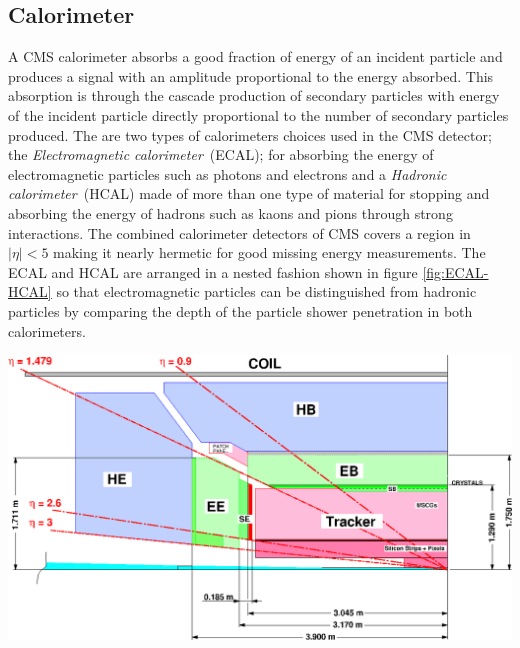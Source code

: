 \subsection{Calorimeter}
A CMS calorimeter absorbs a good fraction of energy of an incident particle and produces a signal with an amplitude proportional to the energy absorbed. This absorption is through the cascade production of secondary particles with energy of the incident particle directly proportional to the number of secondary particles produced. The are two types of calorimeters choices used in the CMS detector; the \textit{Electromagnetic calorimeter}~(ECAL); for absorbing the energy of electromagnetic particles such as photons and electrons and a \textit{Hadronic calorimeter}~(HCAL) made of more than one type of material for stopping and absorbing the energy of hadrons such as kaons and pions through strong interactions. The combined calorimeter detectors of CMS covers a region in $|\eta| < 5 $ making it nearly hermetic for good missing energy measurements. The ECAL and HCAL are arranged in a nested fashion shown in figure \ref{fig:ECAL-HCAL} so that electromagnetic particles can be distinguished from hadronic particles by comparing the depth of the particle shower penetration in both calorimeters.

\begin{center}
\centering
\mbox{\includegraphics[scale=0.5]{THESISPLOTS/ECAL-HCAL.eps}} 
\label{fig:ECAL-HCAL}
\end{center}

